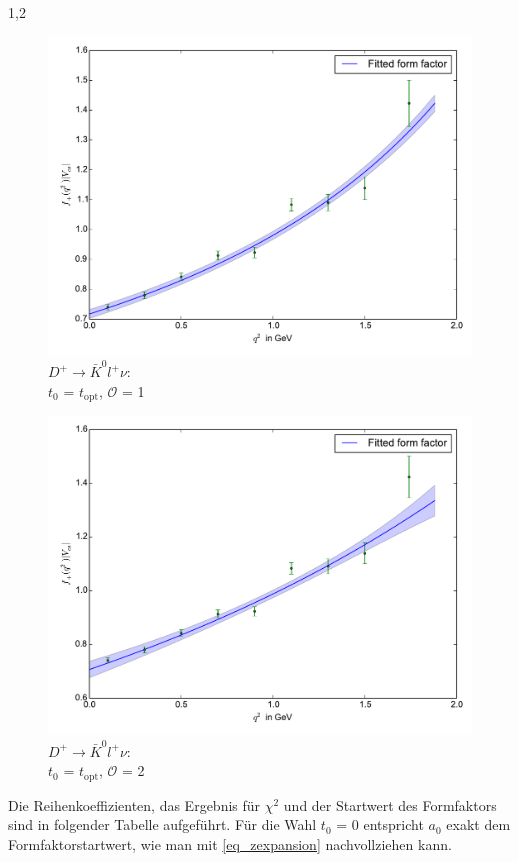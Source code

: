 \documentclass[11pt,a4paper,twoside]{report}
\begin{document}
\begin{spacing}{1,2}
 \begin{minipage}[H]{0.45\textwidth}
 \begin{figure}[H]
 \includegraphics[width=1\textwidth]{Fit/D+-1Ord-t0.pdf}
 \caption{$D^+\rightarrow \bar K^0 l^+ \nu$: \\$t_0$ = $t_{\text{opt}}$, $\mathcal{O}$ = 1}
 \vspace{0.5cm}
 \label{pic_D+-1Ord-t0}
 \end{figure}
 \end{minipage}
 \hfill
 \begin{minipage}[H]{0.45\textwidth}
 \begin{figure}[H]
 \includegraphics[width=1\textwidth]{Fit/D+-2Ord-t0.pdf}
 \caption{$D^+\rightarrow \bar K^0 l^+ \nu$: \\$t_0$ = $t_{\text{opt}}$, $\mathcal{O}$ = 2}
 \vspace{0.5cm}
 \label{pic_D+-2Ord-t0}
 \end{figure}
 \end{minipage}
{}
Die Reihenkoeffizienten, das Ergebnis für $\chi^2$ und der Startwert des Formfaktors sind in folgender Tabelle aufgeführt. Für die Wahl $t_0$ = 0 entspricht
$a_0$ exakt dem Formfaktorstartwert, wie man mit \eqref{eq_zexpansion} nachvollziehen kann.


\end{spacing}
\end{document}
